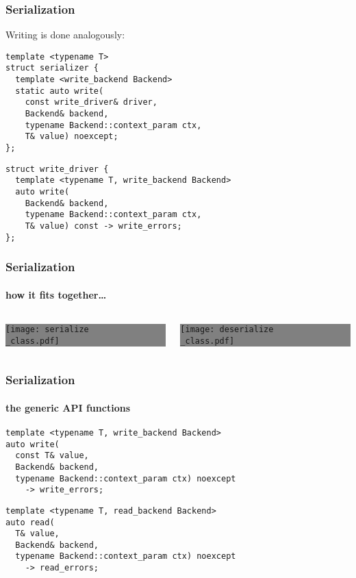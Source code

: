 \documentclass[compress,table,xcolor=table]{beamer}
\begin{document}
\begin{frame}[fragile]
  \frametitle{Serialization}
  Writing is done analogously:
  \begin{lstlisting}[language=c++2x,basicstyle=\footnotesize\ttfamily]
template <typename T>
struct serializer {
  template <write_backend Backend>
  static auto write(
    const write_driver& driver,
    Backend& backend,
    typename Backend::context_param ctx,
    T& value) noexcept;
};
  \end{lstlisting}
  \begin{lstlisting}[language=c++2x,basicstyle=\footnotesize\ttfamily]
struct write_driver {
  template <typename T, write_backend Backend>
  auto write(
    Backend& backend,
    typename Backend::context_param ctx,
    T& value) const -> write_errors;
};
  \end{lstlisting}
\end{frame}
\begin{frame}[fragile]
  \frametitle{Serialization}
  \framesubtitle{how it fits together\ldots}
  \begin{columns}
    \begin{column}{.50\textwidth}
      \colorbox{gray}{
        \begin{minipage}{\dimexpr\textwidth\relax}
        \centering
        \texttt{[image: serialize\\\_class.pdf]}
        \end{minipage}
      }
    \end{column}
    \begin{column}{.50\textwidth}
      \colorbox{gray}{
        \begin{minipage}{\dimexpr\textwidth\relax}
        \centering
        \texttt{[image: deserialize\\\_class.pdf]}
        \end{minipage}
      }
    \end{column}
  \end{columns}
\end{frame}
\begin{frame}[fragile]
  \frametitle{Serialization}
  \framesubtitle{the generic API functions}
  \begin{lstlisting}[language=c++2x,basicstyle=\small\ttfamily]
template <typename T, write_backend Backend>
auto write(
  const T& value,
  Backend& backend,
  typename Backend::context_param ctx) noexcept
    -> write_errors;
  \end{lstlisting}
  \vfill
  \begin{lstlisting}[language=c++2x,basicstyle=\small\ttfamily]
template <typename T, read_backend Backend>
auto read(
  T& value,
  Backend& backend,
  typename Backend::context_param ctx) noexcept
    -> read_errors;
  \end{lstlisting}
\end{frame}
\end{document}
